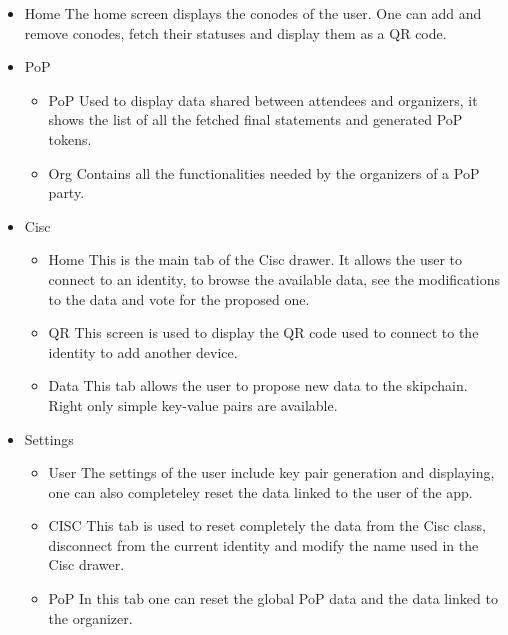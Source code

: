 \begin{itemize}
\item Home \linebreak The home screen displays the conodes of the user. One can add and remove conodes, fetch their statuses and display them as a QR code.

\item PoP
\begin{itemize}
\item PoP \linebreak Used to display data shared between attendees and organizers, it shows the list of all the fetched final statements and generated PoP tokens.

\item Org \linebreak Contains all the functionalities needed by the organizers of a PoP party.
\end{itemize}

\item Cisc
\begin{itemize}
\item Home \linebreak This is the main tab of the Cisc drawer. It allows the user to connect to an identity, to browse the available data, see the modifications to the data and vote for the proposed one.

\item QR \linebreak This screen is used to display the QR code used to connect to the identity to add another device.

\item Data \linebreak This tab allows the user to propose new data to the skipchain. Right only simple key-value pairs are available.
\end{itemize}

\item Settings
\begin{itemize}
\item User \linebreak The settings of the user include key pair generation and displaying, one can also completeley reset the data linked to the user of the app.

\item CISC \linebreak This tab is used to reset completely the data from the Cisc class, disconnect from the current identity and modify the name used in the Cisc drawer.

\item PoP \linebreak In this tab one can reset the global PoP data and the data linked to the organizer.
\end{itemize}
\end{itemize}

